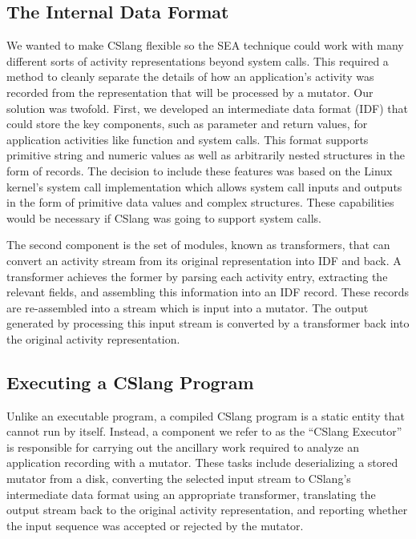 \subsection{The Internal Data Format}

We wanted to make CSlang flexible
so the SEA technique
could
work with many different sorts of
activity representations beyond system calls.
This required a method to cleanly separate the details of how
an application's activity was recorded from the representation that will be
processed by a mutator.
Our solution was twofold.  First, we developed an intermediate data format
(IDF) that
could store the key components, such as parameter and return values,
for application activities like function
and system calls.  This format supports primitive string and numeric
values as well as arbitrarily nested structures in the form of records.
The decision to include these features
was based on the Linux kernel's system call implementation
which allows system call inputs and outputs in the form of primitive data
values and complex structures.
These capabilities would be necessary
if CSlang was going to support system calls.

The second component is the set of modules, known as transformers, that can
convert an activity stream from its original representation into IDF and
back.  A transformer achieves the former by parsing each activity entry,
extracting the relevant fields, and assembling this information into an IDF
record.  These records are re-assembled into a stream which is input into a
mutator.
The output generated by processing this input stream
is converted by a transformer
back into the original activity representation.

\subsection{Executing a CSlang Program}

Unlike an executable program, a compiled CSlang program is a static entity
that cannot run by itself.  Instead, a component we refer to as the
``CSlang Executor'' is responsible for carrying out the ancillary work
required to analyze an application recording with a mutator.
These tasks include deserializing a stored mutator from a disk,
converting the selected input stream
to CSlang's intermediate data format
using an appropriate transformer,
translating the output stream back to the original activity representation,
and reporting whether the input sequence was
accepted or rejected by the mutator.
